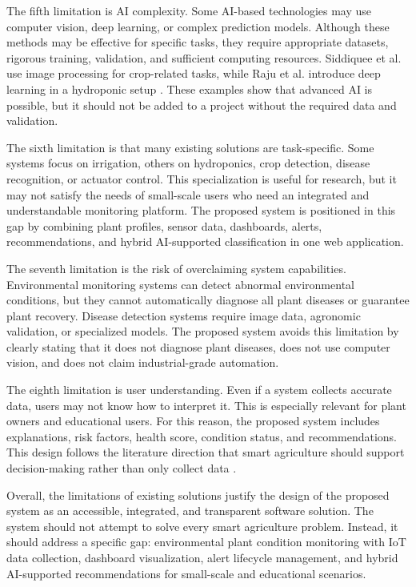 The fifth limitation is AI complexity. Some AI-based technologies may use computer vision, deep learning, or complex prediction models. Although these methods may be effective for specific tasks, they require appropriate datasets, rigorous training, validation, and sufficient computing resources. Siddiquee et al. use image processing for crop-related tasks, while Raju et al. introduce deep learning in a hydroponic setup \cite{siddiquee2022algorithms,raju2022hydroponics}. These examples show that advanced AI is possible, but it should not be added to a project without the required data and validation.

The sixth limitation is that many existing solutions are task-specific. Some systems focus on irrigation, others on hydroponics, crop detection, disease recognition, or actuator control. This specialization is useful for research, but it may not satisfy the needs of small-scale users who need an integrated and understandable monitoring platform. The proposed system is positioned in this gap by combining plant profiles, sensor data, dashboards, alerts, recommendations, and hybrid AI-supported classification in one web application.

The seventh limitation is the risk of overclaiming system capabilities. Environmental monitoring systems can detect abnormal environmental conditions, but they cannot automatically diagnose all plant diseases or guarantee plant recovery. Disease detection systems require image data, agronomic validation, or specialized models. The proposed system avoids this limitation by clearly stating that it does not diagnose plant diseases, does not use computer vision, and does not claim industrial-grade automation.

The eighth limitation is user understanding. Even if a system collects accurate data, users may not know how to interpret it. This is especially relevant for plant owners and educational users. For this reason, the proposed system includes explanations, risk factors, health score, condition status, and recommendations. This design follows the literature direction that smart agriculture should support decision-making rather than only collect data \cite{ahmed2024smart,mansoor2025integration}.

Overall, the limitations of existing solutions justify the design of the proposed system as an accessible, integrated, and transparent software solution. The system should not attempt to solve every smart agriculture problem. Instead, it should address a specific gap: environmental plant condition monitoring with IoT data collection, dashboard visualization, alert lifecycle management, and hybrid AI-supported recommendations for small-scale and educational scenarios.
